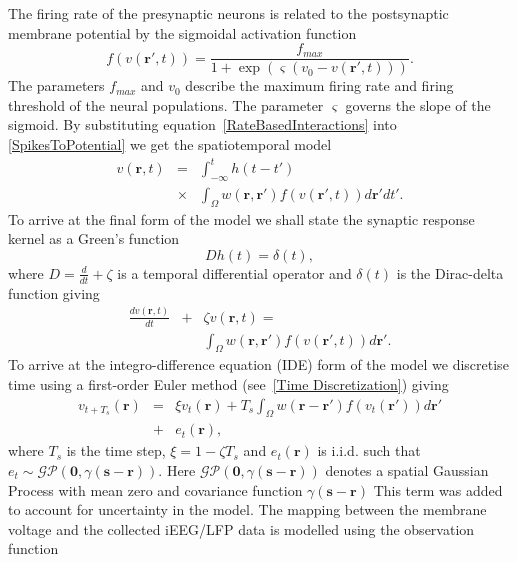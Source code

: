 \documentclass[12pt]{iopart}
\begin{document}
The firing rate of the presynaptic neurons is related to the postsynaptic membrane potential by the sigmoidal activation function 
\begin{equation}
	\label{ActivationFunction} f\left( v\left( \mathbf{r}', t \right) \right) = \frac{f_{max}}{1 + \exp \left( \varsigma \left( v_0 - v\left(\mathbf{r}',t\right) \right) \right)}. 
\end{equation}
The parameters $f_{max}$ and $v_0$ describe the maximum firing rate and firing threshold of the neural populations. The parameter $\varsigma$ governs the slope of the sigmoid. By substituting equation~\ref{RateBasedInteractions} into \ref{SpikesToPotential} we get the spatiotemporal model 
\begin{eqnarray}
	\label{FullDoubleIntModel} v\left(\mathbf{r},t\right) &=&  \int_{-\infty}^t h\left(t - t'\right) \\
	&\times&\int_\Omega w\left(\mathbf{r},\mathbf{r}'\right) f\left( v\left( \mathbf{r}',t \right)\right)d\mathbf{r}'dt'. \nonumber
\end{eqnarray}
To arrive at the final form of the model we shall state the synaptic response kernel as a Green's function 
\begin{equation}
	\label{GreensFuncDef} Dh\left( t \right) = \delta \left( t \right), 
\end{equation}
where $D=\frac{d}{dt} + \zeta$ is a temporal differential operator and $\delta(t)$ is the Dirac-delta function giving 
\begin{eqnarray}
	\label{FinalFormContinuous} \frac{dv\left( \mathbf{r},t \right)}{dt} &+& \zeta v\left( \mathbf{r},t \right) = \\
	&&\int_\Omega {w\left( \mathbf{r},\mathbf{r}' \right)f\left( {v\left( \mathbf{r}',t \right)} \right)d\mathbf{r}'}. \nonumber
\end{eqnarray}
To arrive at the integro-difference equation (IDE) form of the model we discretise time using a first-order Euler method (see~\ref{Time Discretization}) giving 
\begin{eqnarray}
	\label{DiscreteTimeModel} v_{t+T_s}\left(\mathbf{r}\right) &=& \xi v_t\left(\mathbf{r}\right) + T_s \int_\Omega { w\left(\mathbf{r}-\mathbf{r}'\right) f\left(v_t\left(\mathbf{r}'\right)\right) d\mathbf{r}'} \nonumber\\ 
	&+& e_t\left(\mathbf{r}\right), 
\end{eqnarray}
where $T_s$ is the time step, $\xi = 1-\zeta T_s$ and $e_t(\mathbf{r})$ is i.i.d. such that $e_t\sim\mathcal{GP}(\mathbf 0,\gamma(\mathbf{s}-\mathbf{r}))$. Here $\mathcal{GP}(\mathbf 0,\gamma(\mathbf{s}-\mathbf{r}))$ denotes a spatial Gaussian Process with mean zero and covariance function $\gamma(\mathbf{s}-\mathbf{r})$ \cite{Rasmussen2006} This term was added to account for uncertainty in the model. The mapping between the membrane voltage and the collected iEEG/LFP data is modelled using the observation function 
\end{document}
